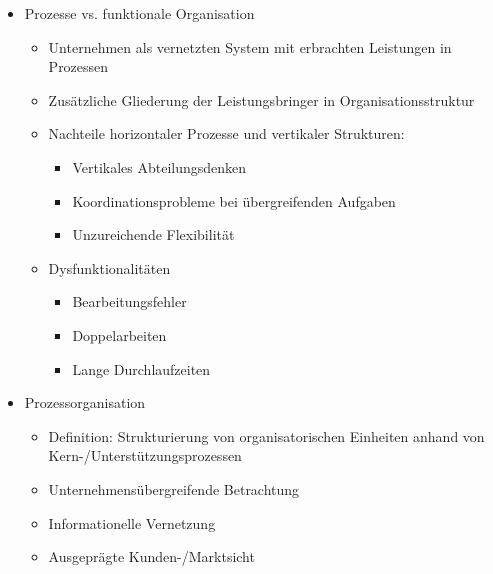 \documentclass[11pt,a4paper]{article}
\begin{document}
\begin{itemize}

\item Prozesse vs. funktionale Organisation
	\begin{itemize}
	\item Unternehmen als vernetzten System mit erbrachten Leistungen in Prozessen
	\item Zusätzliche Gliederung der Leistungsbringer in Organisationsstruktur
	\item Nachteile horizontaler Prozesse und vertikaler Strukturen:
		\begin{itemize}
		\item Vertikales Abteilungsdenken 
		\item Koordinationsprobleme bei übergreifenden Aufgaben
		\item Unzureichende Flexibilität
		\end{itemize}			
	\item Dysfunktionalitäten 
		\begin{itemize}
		\item Bearbeitungsfehler
		\item Doppelarbeiten
		\item Lange Durchlaufzeiten
		\end{itemize}			
		
	\end{itemize}
	
\item Prozessorganisation
	\begin{itemize}
	\item Definition: Strukturierung von organisatorischen Einheiten anhand von Kern-/Unterstützungsprozessen
	\item Unternehmensübergreifende Betrachtung
	\item Informationelle Vernetzung
	\item Ausgeprägte Kunden-/Marktsicht
	\end{itemize}
	

\end{itemize}
\end{document}
